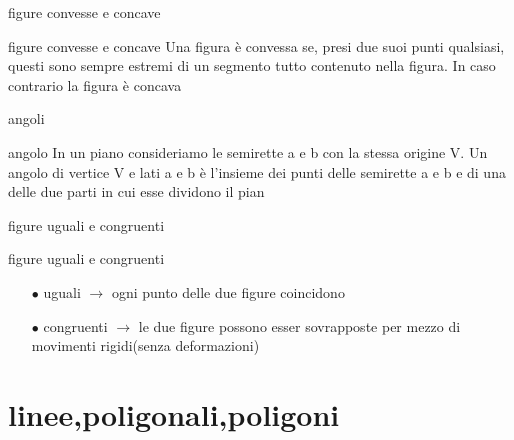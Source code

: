 \documentclass{beamer}
\begin{document}
\begin{frame}{figure convesse e concave}
    \begin{block}{figure convesse e concave}
       Una figura è convessa se, presi due suoi punti qualsiasi, questi sono sempre estremi di un segmento tutto contenuto nella figura. In caso contrario la figura è concava
    \end{block}
\end{frame}
\begin{frame}{angoli}
    \begin{block}{angolo}
   In un piano consideriamo le semirette a e b con la stessa origine V. Un angolo di vertice V e lati a e b è l’insieme dei punti delle semirette a e b e di una delle due parti in cui esse dividono il pian
    \end{block}
\end{frame}
\begin{frame}{figure uguali e congruenti}
    \begin{block}{figure uguali e congruenti}
       \begin{itemize}
           \item[$\bullet$] uguali $\rightarrow$ ogni punto delle due figure coincidono
           \item[$\bullet$] congruenti $\rightarrow$ le due figure possono esser sovrapposte per mezzo di movimenti rigidi(senza deformazioni)
       \end{itemize}
    \end{block}
\end{frame}
\section{linee,poligonali,poligoni}
\end{document}
